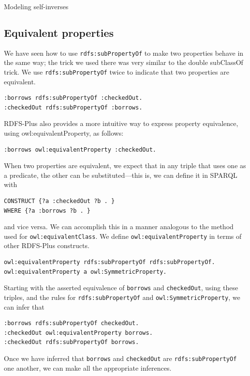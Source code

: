 \begin{challenge}{Modeling self-inverses}
\subsection{Equivalent properties}

We have seen how to use \texttt{rdfs:subPropertyOf} to make two properties behave
in the same way; the trick we used there was very similar to the double
subClassOf trick. We use \texttt{rdfs:subPropertyOf} twice to indicate that two
properties are equivalent.

\begin{lstlisting}
:borrows rdfs:subPropertyOf :checkedOut.
:checkedOut rdfs:subPropertyOf :borrows.
\end{lstlisting}

RDFS-Plus also provides a more intuitive way to express property
equivalence, using
owl:equivalentProperty, as follows:

\begin{lstlisting}
:borrows owl:equivalentProperty :checkedOut.
\end{lstlisting}

When two properties are equivalent, we expect that in any triple that
uses one as a predicate, the other can be substituted---this is, we can
define it in SPARQL with

\begin{lstlisting}
CONSTRUCT {?a :checkedOut ?b . }
WHERE {?a :borrows ?b . }
\end{lstlisting}

and vice versa. We can accomplish this in a manner analogous to the
method used for \texttt{owl:equivalentClass}. We define \texttt{owl:equivalentProperty} in
terms of other RDFS-Plus constructs.

\begin{lstlisting}
owl:equivalentProperty rdfs:subPropertyOf rdfs:subPropertyOf.
owl:equivalentProperty a owl:SymmetricProperty.
\end{lstlisting}

Starting with the asserted equivalence of \texttt{borrows} and \texttt{checkedOut}, using
these triples, and the rules for \texttt{rdfs:subPropertyOf} and
\texttt{owl:SymmetricProperty}, we can infer that

\begin{lstlisting}
:borrows rdfs:subPropertyOf checkedOut.
:checkedOut owl:equivalentProperty borrows.
:checkedOut rdfs:subPropertyOf borrows.
\end{lstlisting}

Once we have inferred that \texttt{borrows} and \texttt{checkedOut} are \texttt{rdfs:subPropertyOf}
one another, we can make all the appropriate inferences.


\end{challenge}
